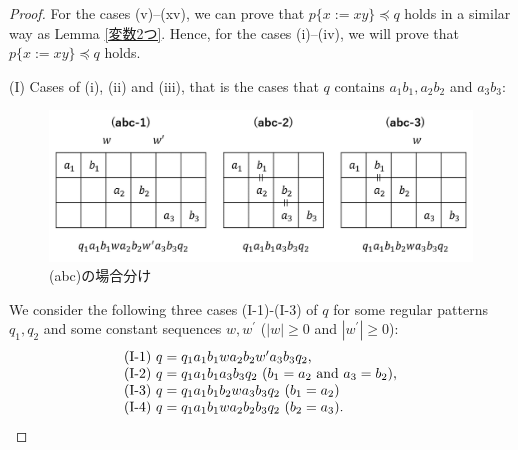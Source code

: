 \begin{proof}
\noindent
For the cases (v)--(xv), we can prove that $p \{ x := xy \} \preceq q$ holds in a similar way as Lemma \ref{変数2つ}.
Hence, for the cases (i)--(iv), we will prove that $p \{ x := xy \} \preceq q$ holds.


\smallskip
\noindent
(I) Cases of (i), (ii) and (iii), that is the cases that $q$ contains $a_{1}b_{1}, a_{2}b_{2}$ and $a_{3}b_{3}$:

\begin{figure}
\centering
\includegraphics[width=\linewidth]{figs/Cases-abc.png}
\vspace{-1cm}
\caption{(abc)の場合分け}
\label{abc組み合わせ}
\end{figure}

\noindent
We consider the following three cases (I-1)-(I-3) of $q$ for some regular patterns $q_{1},q_{2}$ and some constant sequences $w,w^{\prime}$ ($|w|\geq 0$ and $|w^{\prime}|\geq 0$):
\[
\begin{tabular}{ll}
(I-1) $q=q_{1}a_{1}b_{1}wa_{2}b_{2}w^{\prime}a_{3}b_{3}q_{2}$,\\
(I-2) $q=q_{1}a_{1}b_{1}a_{3}b_{3}q_{2}$ ($b_{1}=a_{2}$ and $a_{3}=b_{2}$),\\
(I-3) $q=q_{1}a_{1}b_{1}b_{2}wa_{3}b_{3}q_{2}$ ($b_{1}=a_{2}$)\\
(I-4) $q=q_{1}a_{1}b_{1}wa_{2}b_{2}b_{3}q_{2}$ ($b_{2}=a_{3}$).
\end{tabular}
\]


\end{proof}
